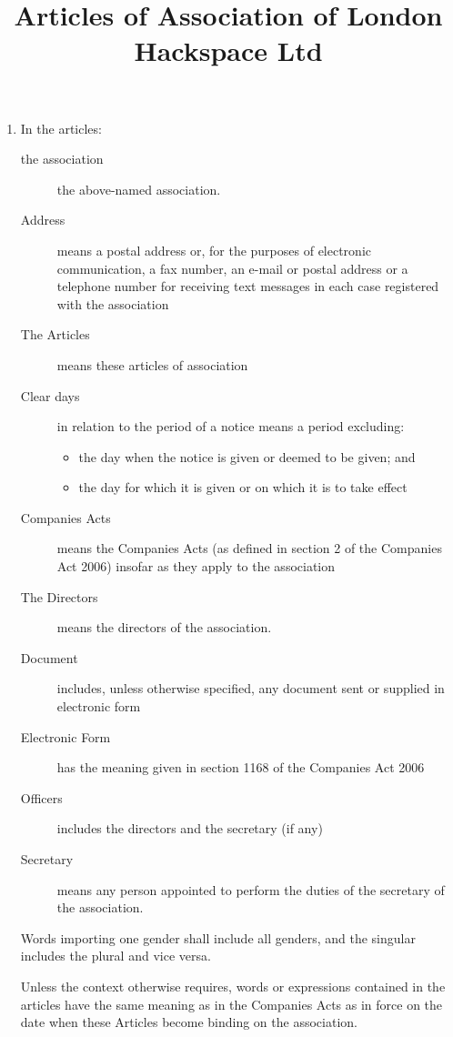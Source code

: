 \title{Articles of Association of London Hackspace Ltd}
\begin{enumerate}
\section{Interpretation}
\item
  In the articles:
  \begin{description}
  \item[the association] the above-named association.
  \item[Address] means a postal address or, for the purposes of
    electronic communication, a fax number, an e-mail or postal address
    or a telephone number for receiving text messages in each case
    registered with the association
  \item[The Articles] means these articles of association
  \item[Clear days] in relation to the period of a notice means a period
    excluding:
    \begin{itemize}
    \item
      the day when the notice is given or deemed to be given; and
    \item
      the day for which it is given or on which it is to take effect
    \end{itemize}
  \item[Companies Acts] means the Companies Acts (as defined in section
    2 of the Companies Act 2006) insofar as they apply to the association
  \item[The Directors] means the directors of the association.
  \item[Document] includes, unless otherwise specified, any document sent or supplied in electronic form
  \item[Electronic Form] has the meaning given in section 1168 of the Companies Act 2006
  \item[Officers] includes the directors and the secretary (if any)
  \item[Secretary] means any person appointed to perform the duties of
    the secretary of the association.
  \end{description}
  Words importing one gender shall include all genders, and the singular
  includes the plural and vice versa.

  Unless the context otherwise requires, words or expressions
  contained in the articles have the same meaning as in the Companies
  Acts as in force on the date when these Articles become binding
  on the association.


\end{enumerate}
